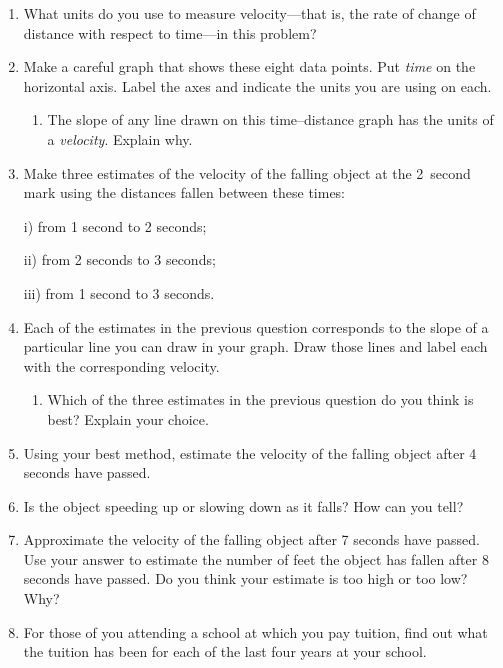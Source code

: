 \begin{enumerate}
\item What units do you use to measure velocity---that is, the rate of
change of distance with respect to time---in this problem?


\item Make a careful graph that shows these eight data points.  Put
      {\em time\/} on the horizontal axis.  Label the axes and
      indicate the units you are using on each.

  \begin{enumerate}
  \item The slope of any line drawn on this time--distance graph has the
units of a {\em velocity}.  Explain why.

\enlargethispage*{20pt}

\end{enumerate}
\item Make three estimates of the velocity of the falling object at the
2~second mark using the distances fallen between these times:

	i) from 1 second to 2 seconds;

	ii) from 2 seconds to 3 seconds;

	iii) from 1 second to 3 seconds.


\item Each of the estimates in the previous question corresponds to
the slope of a particular line you can draw in your graph.  Draw those
lines and label each with the corresponding velocity.

  \begin{enumerate}
  \item Which of the three estimates in the previous question do you
think is best?  Explain your choice.


\end{enumerate}
\item Using your best method, estimate the velocity of the falling
object after 4 seconds have passed.


\item Is the object speeding up or slowing down as it falls?  How can
you tell?


\item Approximate the velocity of the falling object after 7 seconds
have passed.  Use your answer to estimate the number of feet the
object has fallen after 8 seconds have passed.  Do you think your
estimate is too high or too low?  Why?


\item For those of you attending a school at which you pay tuition,
find out what the tuition has been for each of the last four years at
your school.


\end{enumerate}
